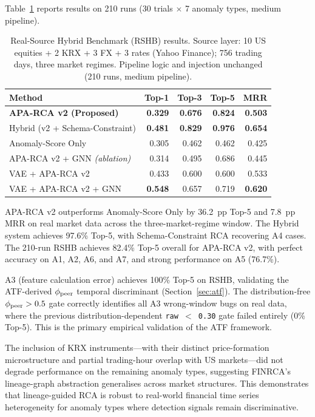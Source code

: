 \documentclass{article}
\newcommand{\finrca}{\textsc{FINRCA}}
\newcommand{\aparca}{\textsc{APA-RCA}}
\begin{document}
Table~\ref{tab:rshb} reports results on 210 runs (30 trials $\times$ 7 anomaly types,
medium pipeline).

\begin{table}[h]
  \centering
  \caption{Real-Source Hybrid Benchmark (RSHB) results.
           Source layer: 10 US equities + 2 KRX + 3 FX + 3 rates (Yahoo Finance);
           756 trading days, three market regimes.
           Pipeline logic and injection unchanged (210 runs, medium pipeline).}
  \label{tab:rshb}
  \small
  \begin{tabular}{lrrrr}
    \toprule
    Method & Top-1 & Top-3 & Top-5 & MRR \\
    \midrule
    \textbf{\aparca{} v2 (Proposed)} & \textbf{0.329} & \textbf{0.676} & \textbf{0.824} & \textbf{0.503} \\
    Hybrid (v2 + Schema-Constraint)  & \textbf{0.481} & \textbf{0.829} & \textbf{0.976} & \textbf{0.654} \\
    Anomaly-Score Only                & 0.305 & 0.462 & 0.462 & 0.425 \\
    \hdashline
    \aparca{} v2 + GNN \emph{(ablation)} & 0.314 & 0.495 & 0.686 & 0.445 \\
    VAE + \aparca{} v2               & 0.433 & 0.600 & 0.600 & 0.533 \\
    VAE + \aparca{} v2 + GNN         & \textbf{0.548} & 0.657 & 0.719 & \textbf{0.620} \\
    \bottomrule
  \end{tabular}
\end{table}

\aparca{} v2 outperforms Anomaly-Score Only by 36.2~pp Top-5 and 7.8~pp MRR
on real market data across the three-market-regime window.
The Hybrid system achieves 97.6\% Top-5, with Schema-Constraint RCA recovering A4 cases.
The 210-run RSHB achieves 82.4\% Top-5 overall for \aparca{} v2,
with perfect accuracy on A1, A2, A6, and A7, and strong performance on A5 (76.7\%).

A3 (feature calculation error) achieves 100\% Top-5 on RSHB, validating the ATF-derived $\phi_{\rm peer}$ temporal discriminant (Section~\ref{sec:atf}). The distribution-free $\phi_{\rm peer} > 0.5$ gate correctly identifies all A3 wrong-window bugs on real data, where the previous distribution-dependent \texttt{raw\,$<$\,0.30} gate failed entirely (0\% Top-5). This is the primary empirical validation of the ATF framework.

The inclusion of KRX instruments---with their distinct price-formation microstructure
and partial trading-hour overlap with US markets---did not degrade performance on
the remaining anomaly types, suggesting \finrca{}'s lineage-graph abstraction
generalises across market structures.
This demonstrates that lineage-guided RCA is robust to real-world financial time
series heterogeneity for anomaly types where detection signals remain discriminative.
\end{document}
